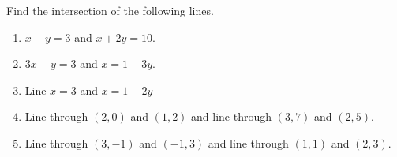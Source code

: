 \begin{frame}
\begin{example}
Find the intersection of the following lines.
\begin{enumerate}
\item $x-y=3$ and $x+2y=10$.
\item $3x-y=3$ and $x=1-3y$.
\item Line $x=3$ and $x=1-2y$
\item Line through $(2,0)$ and $(1,2)$ and line through $(3,7 )$ and $(2,5)$.
\item Line through $(3,-1)$ and $(-1, 3)$ and line through $(1,1)$ and $(2,3)$.
\end{enumerate}

\end{example}

\end{frame}